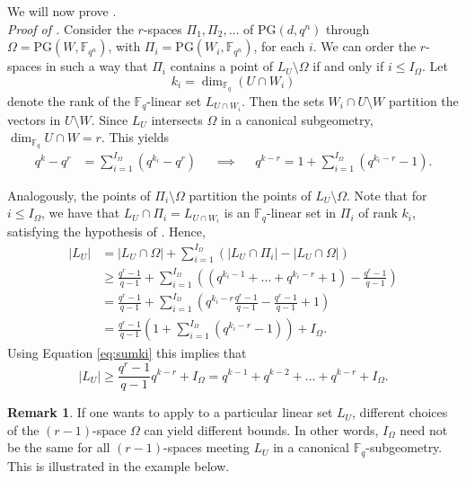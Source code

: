 \documentclass[11pt]{article}
\theoremstyle{definition}
\newtheorem{remark}[theorem]{Remark}
\newcommand{\fqn}{\mathbb{F}_{q^n}}
\newcommand{\F}{{\mathbb F}}
\newcommand{\fq}{{\mathbb F}_{q}}
\newcommand{\PG}{\mathrm{PG}}
\begin{document}
We will now prove .\\

\noindent \textit{Proof of .}
Consider the $r$-spaces $\Pi_1,\Pi_2,\ldots$ of $\PG(d,q^n)$ through $\Omega = \PG(W,\fqn)$, with $\Pi_i=\PG(W_i,\F_{q^n})$, for each $i$.
We can order the $r$-spaces in such a way that $\Pi_i$ contains a point of $L_U \setminus \Omega$ if and only if $i \leq I_{\Omega}$.
Let 
\[
k_i= \dim_{\fq} (U \cap W_i)
\]
denote the rank of the $\fq$-linear set $L_{U \cap W_i}$.
Then the sets $W_i \cap U \setminus W$ partition the vectors in $U \setminus W$. 
Since $L_U$ intersects $\Omega$ in a canonical subgeometry, $\dim_{\fq} U \cap W = r$.
This yields 
\begin{align}
 \label{eq:sumki}
q^{k} - q^r &= \sum_{i = 1}^{I_\Omega} (q^{k_i} - q^r) &&
\implies && q^{k-r}  =1 + \sum_{i=1}^{I_\Omega} (q^{k_i - r} -1).
\end{align}

Analogously, the points of $\Pi_i \setminus \Omega$ partition the points of $L_U \setminus \Omega$. 
Note that for $i \leq I_{\Omega}$, we have that $L_U \cap \Pi_i= L_{U \cap W_i}$ is an $\F_q$-linear set in $\Pi_i$ of rank $k_i$, satisfying the hypothesis of .
Hence,
\begin{align*}
 |L_U|
 & = |L_U \cap \Omega| + \sum_{i=1}^{I_\Omega} \left( |L_U \cap \Pi_i| - |L_U \cap \Omega| \right) \\
 & \geq \frac{q^r-1}{q-1} + \sum_{i=1}^{I_\Omega} \left( (q^{k_i-1} + \ldots + q^{k_i-r} + 1) - \frac{q^r-1}{q-1} \right) \\
 & = \frac{q^r-1}{q-1} + \sum_{i=1}^{I_\Omega} \left( q^{k_i-r} \frac{q^r-1}{q-1} - \frac{q^r-1}{q-1} + 1 \right) \\
 & = \frac{q^r-1}{q-1} \left(1 + \sum_{i=1}^{I_\Omega} (q^{k_i-r} - 1) \right) + I_\Omega.
\end{align*}
Using Equation \eqref{eq:sumki} this implies that
\[
\lvert L_U \rvert \geq \frac{q^r-1}{q-1} q^{k-r} + I_\Omega = q^{k-1}+q^{k-2}+\ldots+q^{k-r}+I_{\Omega}.
\tag*{\qedsymbol}
\]

\begin{remark}
If one wants to apply  to a particular linear set $L_U$, different choices of the $(r-1)$-space $\Omega$ can yield different bounds.
In other words, $I_\Omega$ need not be the same for all $(r-1)$-spaces meeting $L_U$ in a canonical $\fq$-subgeometry.
This is illustrated in the example below. 
\end{remark}
\end{document}
